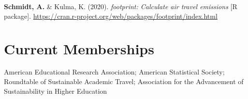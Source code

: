 \documentclass[10pt,a4paper,]{article}
\begin{document}
\begingroup
\setlength{\parindent}{-0.5in}
\setlength{\leftskip}{0.5in}

\textbf{Schmidt, A.} \& Kulma, K. (2020). \emph{footprint: Calculate air travel emissions} {[}R package{]}. \url{https://cran.r-project.org/web/packages/footprint/index.html}

\endgroup

\hypertarget{current-memberships}{%
\section{Current Memberships}\label{current-memberships}}

American Educational Research Association; American Statistical Society; Roundtable of Sustainable Academic Travel; Association for the Advancement of Sustainability in Higher Education
\end{document}

